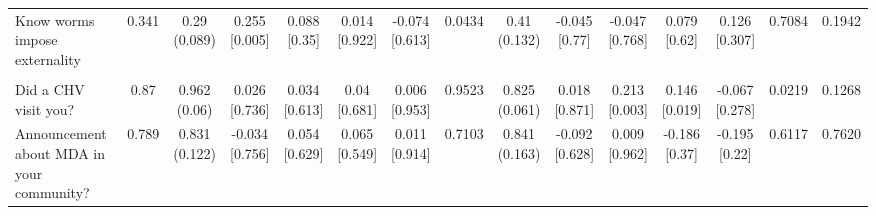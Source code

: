 {\begin{tabular}[t]{lcccccccccccccc}
\hspace{1em}Know worms impose externality & 0.341 & \makecell[c]{0.29\\(0.089)} & \makecell[c]{0.255\\{[0.005]}} & \makecell[c]{0.088\\{[0.35]}} & \makecell[c]{0.014\\{[0.922]}} & \makecell[c]{-0.074\\{[0.613]}} & 0.0434 & \makecell[c]{0.41\\(0.132)} & \makecell[c]{-0.045\\{[0.77]}} & \makecell[c]{-0.047\\{[0.768]}} & \makecell[c]{0.079\\{[0.62]}} & \makecell[c]{0.126\\{[0.307]}} & 0.7084 & 0.1942\\
\addlinespace[0.3em]
\hline
\multicolumn{15}{l}{\textit{\textbf{Panel D: Implementation, $N=252$}}}\\
\hline
\hspace{1em}Did a CHV visit you? & 0.87 & \makecell[c]{0.962\\(0.06)} & \makecell[c]{0.026\\{[0.736]}} & \makecell[c]{0.034\\{[0.613]}} & \makecell[c]{0.04\\{[0.681]}} & \makecell[c]{0.006\\{[0.953]}} & 0.9523 & \makecell[c]{0.825\\(0.061)} & \makecell[c]{0.018\\{[0.871]}} & \makecell[c]{0.213\\{[0.003]}} & \makecell[c]{0.146\\{[0.019]}} & \makecell[c]{-0.067\\{[0.278]}} & 0.0219 & 0.1268\\
\hspace{1em}Announcement about MDA in your community? & 0.789 & \makecell[c]{0.831\\(0.122)} & \makecell[c]{-0.034\\{[0.756]}} & \makecell[c]{0.054\\{[0.629]}} & \makecell[c]{0.065\\{[0.549]}} & \makecell[c]{0.011\\{[0.914]}} & 0.7103 & \makecell[c]{0.841\\(0.163)} & \makecell[c]{-0.092\\{[0.628]}} & \makecell[c]{0.009\\{[0.962]}} & \makecell[c]{-0.186\\{[0.37]}} & \makecell[c]{-0.195\\{[0.22]}} & 0.6117 & 0.7620\\

\end{tabular}}
